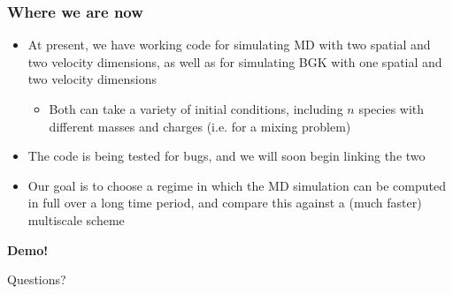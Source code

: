 \documentclass{beamer}
\begin{document}
\begin{frame}
\frametitle{Where we are now}
\begin{itemize}
\item At present, we have working code for simulating MD with two spatial and two velocity dimensions, as well as for simulating BGK with one spatial and two velocity dimensions
\vspace{1em}
\begin{itemize}\item Both can take a variety of initial conditions, including $n$ species with different masses and charges (i.e. for a mixing problem)\vspace{1em}
\end{itemize}

\item The code is being tested for bugs, and we will soon begin linking the two
\vspace{1em}
\item Our goal is to choose a regime in which the MD simulation can be computed in full over a long time period, and compare this against a (much faster) multiscale scheme
\end{itemize}\vspace{1em}\begin{center}\large \textbf{Demo!}\end{center}
\end{frame}

\begin{frame}
\begin{center}\huge Questions?\end{center}
\end{frame}
\end{document}
